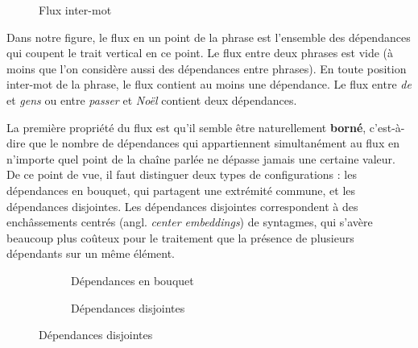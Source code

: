 {\begin{figure}[H]
\begin{tikzpicture}
    \end{tikzpicture}
    \caption{Flux inter-mot\label{fig:}}
    \end{figure}

    Dans notre figure, le flux en un point de la phrase est l’ensemble des dépendances qui coupent le trait vertical en ce point. Le flux entre deux phrases est vide (à moins que l’on considère aussi des dépendances entre phrases). En toute position inter-mot de la phrase, le flux contient au moins une dépendance. Le flux entre \textit{de} et \textit{gens} ou entre \textit{passer} et \textit{Noël} contient deux dépendances.

    La première propriété du flux est qu’il semble être naturellement \textbf{borné}, c’est-à-dire que le nombre de dépendances qui appartiennent simultanément au flux en n’importe quel point de la chaîne parlée ne dépasse jamais une certaine valeur. De ce point de vue, il faut distinguer deux types de configurations : les dépendances en bouquet, qui partagent une extrémité commune, et les dépendances disjointes. Les dépendances disjointes correspondent à des enchâssements centrés (angl. \textit{center embeddings}) de syntagmes, qui s’avère beaucoup plus coûteux pour le traitement que la présence de plusieurs dépendants sur un même élément.


    \begin{figure}
    \caption{Configurations de dépendances à un point du flux}
    \begin{subfigure}[b]{.5\linewidth}
    \caption{Dépendances en bouquet}
    \end{subfigure}%
    \begin{subfigure}[b]{.5\linewidth}
    \caption{Dépendances disjointes}
    \end{subfigure}
    \end{figure}

}
